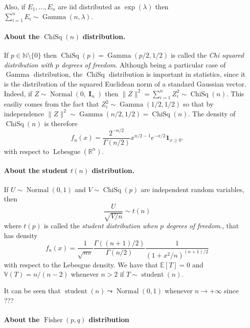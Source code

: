 \documentclass[
	fontsize=11pt, %
	twoside=false, %
	numbers=noenddot, %
]{kaobook}
\DeclareMathOperator{\bI}{{\boldsymbol I}}
\DeclareMathOperator{\chisq}{ChiSq}
\DeclareMathOperator{\fis}{Fisher}
\DeclareMathOperator{\gam}{Gamma}
\DeclareMathOperator{\nor}{Normal}
\DeclareMathOperator{\stu}{student}
\DeclareMathOperator{\leb}{Lebesgue}
\newcommand{\E}{\mathbb E}
\newcommand{\R}{\mathbb R}
\newcommand{\N}{\mathbb N}
\newcommand{\var}{\mathbb V}
\newcommand{\ind}[1]{\mathbf 1_{#1}}
\newcommand{\norm}[1]{\|#1\|}
\newcommand{\gosto}{\leadsto}
\begin{document}
Also, if $E_1, \ldots, E_n$ are iid distributed as $\exp(\lambda)$ then $\sum_{i=1}^n E_i \sim \gam(n, \lambda)$.

\paragraph{About the $\chisq(n)$ distribution.} %

If $p \in \N \setminus \{ 0 \}$ then $\chisq(p) = \gam(p/2, 1/2)$ is called the \emph{Chi squared distribution with $p$ degrees of freedom}.
Although being a particular case of $\gam$ distribution, the $\chisq$ distribution is important in statistics, since it is the distribution of the squared Euclidean norm of a standard Gaussian vector.
Indeed, if $Z \sim \nor(0, \bI_n)$ then $\norm{Z}^2 = \sum_{i=1}^n Z_i^2 \sim \chisq(n)$.
This easiliy comes from the fact that $Z_i^2 \sim \gam(1/2, 1/2)$ so that by independence $\norm{Z}^2 \sim \gam(n/2, 1/2) = \chisq(n)$.
The density of $\chisq(n)$ is therefore 
\begin{equation*}
	f_n(x) = \frac{2^{-n / 2}}{\Gamma(n/2)} x^{n / 2 - 1} e^{-x / 2} \ind{x \geq 0}.
\end{equation*}
with respect to $\leb(\R^n)$.

\paragraph{About the student $t(n)$ distribution.} %


If $U \sim \nor(0, 1)$ and $V \sim \chisq(p)$ are independent random variables, then
\begin{equation*}
	\frac{U}{\sqrt{V / n}} \sim t(n)
\end{equation*}
where $t(p)$ is called the \emph{student distribution when $p$ degrees of freedom}., that has density
\begin{equation*}
	f_n(x) = \frac{1}{\sqrt{n \pi}} \frac{\Gamma((n+1) / 2)}{\Gamma(n/2)} \frac{1}{(1 + x^2 / n)^{(n + 1)/2}}
\end{equation*}
with respect to the Lebesgue density. We have that $\E[T] = 0$ and $\var(T) = n / (n - 2)$ whenever $n > 2$ if $T \sim \stu(n)$.

It can be seen that $\stu(n) \gosto \nor(0, 1)$ whenever $n \rightarrow +\infty$ since ???

\paragraph{About the $\fis(p, q)$ distribution} %
\end{document}
